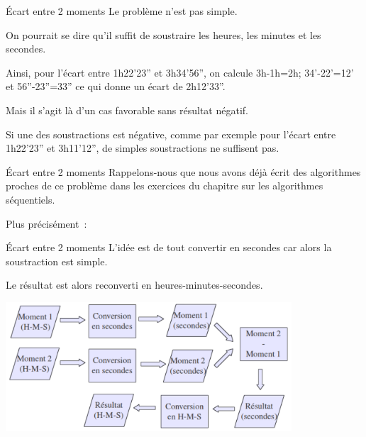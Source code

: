 \begin{frame}{Écart entre 2 moments}
	Le problème n'est pas simple. 
	
	\bigskip
	
	On pourrait se dire qu'il suffit de soustraire les heures, 
	les minutes et les secondes.

	\bigskip
	
	Ainsi, pour l'écart entre
	1h22'23'' et
	3h34'56'', on
	calcule 3h-1h=2h;
	34'-22'=12' et
	56''-23''=33''
	ce qui donne un écart de
	2h12'33''.

	\bigskip
	
	Mais il s'agit là d'un cas favorable
	sans résultat négatif. 
	
	\bigskip
	
	Si une des soustractions est négative, comme par
	exemple pour l'écart entre
	1h22'23'' et
	3h11'12'', de
	simples soustractions ne suffisent pas.
\end{frame}

\begin{frame}{Écart entre 2 moments}
	Rappelons-nous que nous
	avons déjà écrit des algorithmes proches de ce problème dans les
	exercices du chapitre sur les algorithmes séquentiels. 
	
	\bigskip
	
	Plus précisément~:

	\bigskip
	
\end{frame}

\begin{frame}{Écart entre 2 moments}
	L'idée est de tout convertir en
	secondes car alors la soustraction est simple. 
	
	\bigskip
	
	Le résultat est alors
	reconverti en heures-minutes-secondes.

	\begin{center}
	\includegraphics[width=0.8\textwidth]{image/module-conversion}
	\end{center}
\end{frame}

